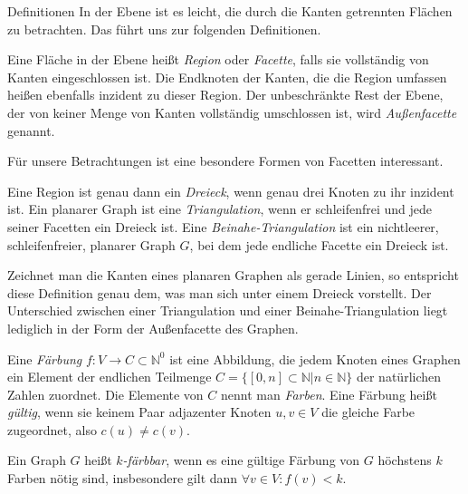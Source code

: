 \begin{chapter}{Definitionen}
  In der Ebene ist es leicht, die durch die Kanten getrennten Flächen zu betrachten. Das führt uns zur folgenden Definitionen.
  
  \begin{definition}
   Eine Fläche in der Ebene heißt \textit{Region} oder \textit{Facette}, falls sie vollständig von Kanten eingeschlossen ist. Die Endknoten der Kanten, die die Region umfassen heißen ebenfalls inzident zu dieser Region. Der unbeschränkte Rest der Ebene, der von keiner Menge von Kanten vollständig umschlossen ist, wird \textit{Außenfacette} genannt.
  \end{definition}
  
  Für unsere Betrachtungen ist eine besondere Formen von Facetten interessant. 
  
  \begin{definition}
   Eine Region ist genau dann ein \textit{Dreieck}, wenn genau drei Knoten zu ihr inzident ist. Ein planarer Graph ist eine \textit{Triangulation}, wenn er schleifenfrei und jede seiner Facetten ein Dreieck ist. Eine \textit{Beinahe-Triangulation} ist ein nichtleerer, schleifenfreier, planarer Graph $G$, bei dem jede endliche Facette ein Dreieck ist. 
  \end{definition}
  
  Zeichnet man die Kanten eines planaren Graphen als gerade Linien, so entspricht diese Definition genau dem, was man sich unter einem Dreieck vorstellt. Der Unterschied zwischen einer Triangulation und einer Beinahe-Triangulation liegt lediglich in der Form der Außenfacette des Graphen. 
  
  \begin{definition}
   Eine \textit{Färbung} $f: V \rightarrow C \subset \mathbb{N}^0$ ist eine Abbildung, die jedem Knoten eines Graphen ein Element der endlichen Teilmenge $C = \{[0,n] \subset \mathbb{N}| n \in \mathbb{N}\}$ der natürlichen Zahlen zuordnet. Die Elemente von $C$ nennt man \textit{Farben}. Eine Färbung heißt \textit{gültig}, wenn sie keinem Paar adjazenter Knoten $u,v \in V$ die gleiche Farbe zugeordnet, also $c(u) \neq c(v)$. 
  \end{definition}
  
  \begin{definition}[$k$-Färbbarkeit]
   Ein Graph $G$ heißt \textit{$k$-färbbar}, wenn es eine gültige Färbung von $G$ höchstens $k$ Farben nötig sind, insbesondere gilt dann $\forall v \in V: f(v) < k$.
  \end{definition}
  

\end{chapter}
